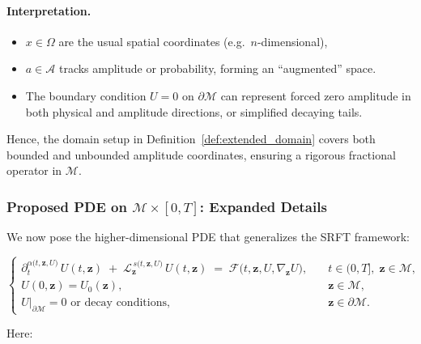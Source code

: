 \documentclass[12pt]{article}
\begin{document}
\paragraph{Interpretation.}
\begin{itemize}
    \item $x \in \Omega$ are the usual spatial coordinates (e.g.\ $n$-dimensional),
    \item $a \in \mathcal{A}$ tracks amplitude or probability, forming an ``augmented'' space.  
    \item The boundary condition $U=0$ on $\partial \mathcal{M}$ can represent forced zero amplitude 
          in both physical and amplitude directions, or simplified decaying tails.
\end{itemize}
Hence, the domain setup in Definition~\ref{def:extended_domain} covers both bounded and 
unbounded amplitude coordinates, ensuring a rigorous fractional operator in $\mathcal{M}$.

\subsubsection{Proposed PDE on \texorpdfstring{\(\mathcal{M}\times [0,T]\)}{}: Expanded Details}
\label{subsubsec:extended_pde_formulation}

We now pose the higher-dimensional PDE that generalizes the SRFT framework:

\begin{equation}
\label{eq:extendedPDE_detailed}
\begin{cases}
\displaystyle
\partial_{t}^{\alpha\bigl(t,\mathbf{z},U\bigr)}\,U(t,\mathbf{z})
\;+\;
\mathcal{L}_{\mathbf{z}}^{\,s\bigl(t,\mathbf{z},U\bigr)}\, U(t,\mathbf{z})
\;=\;
\mathcal{F}\bigl(t,\mathbf{z}, U, \nabla_{\mathbf{z}}U\bigr),
& \quad t \in (0,T],\;\mathbf{z}\in \mathcal{M},
\\[6pt]
U(0,\mathbf{z}) = U_0(\mathbf{z}),
& \quad \mathbf{z}\in \mathcal{M},
\\[6pt]
U\big|_{\partial\mathcal{M}}=0 \text{ or decay conditions},
& \quad \mathbf{z}\in \partial\mathcal{M}.
\end{cases}
\end{equation}

Here:
\end{document}
